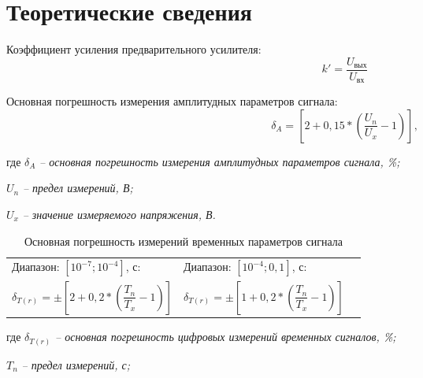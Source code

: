 \section{Теоретические сведения}

Коэффициент усиления предварительного усилителя:
\begin{equation}
\label{equation:eq1}
	k' = \dfrac{U_{\text{вых}}} {U_{\text{вх}}}
\end{equation}

Основная погрешность измерения амплитудных параметров сигнала:
\begin{equation}
\label{equation:eq2}
	\delta_{A} = \left[2 + 0,15 \ast \left( \dfrac{U_{n}}{U_{x}} - 1 \right) \right] , 
\end{equation}

где $ \delta_{A} $ \textit{-- основная погрешность измерения амплитудных параметров сигнала, \%;}

\hspace{5mm} $ U_{n} $ \textit{-- предел измерений, В;} 

\hspace{5mm} $ U_{x} $ \textit{-- значение измеряемого напряжения, В.} 

\vspace{4mm}

\begin{table} [h!]
	\centering
	\begin{tabular}{ p{7cm}  p{7cm}l }
		\centering Диапазон: $ [10^{-7}; 10^{-4}] $, с: & 
		\centering Диапазон: $ [10^{-4}; 0,1] $, с: & \\
        \vspace{1mm}

        \centering $ \delta_{T(r)} = \pm \left[ 2+0,2 * \left(\dfrac{T_n}{T_x}-1 \right) \right] $
        &
        \vspace{1mm}
		\centering $ \delta_{T(r)} = \pm \left[ 1+0,2 * \left(\dfrac{T_n}{T_x}-1 \right) \right] $
        & \\
		
	\end{tabular}
	\caption{Основная погрешность измерений временных параметров сигнала}
\end{table}

где $ \delta_{T(r)} $ \textit{-- основная погрешность цифровых измерений временных сигналов, \%;}

\hspace{5mm} $ T_n $ \textit{-- предел измерений, с;}

